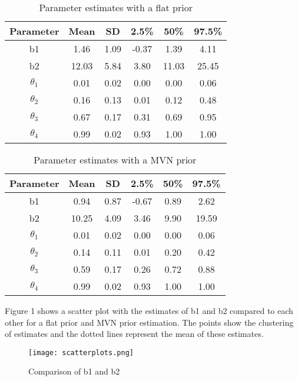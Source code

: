 \documentclass{article}
\begin{document}
\begin{table}[H]
\centering
\caption{Parameter estimates with a flat prior}
\label{my-label}
\begin{tabular}{|c|c|c|c|c|c|}
\hline
Parameter  & Mean  & SD   & 2.5\% & 50\%  & 97.5\% \\ \hline
b1         & 1.46  & 1.09 & -0.37 & 1.39  & 4.11   \\ \hline
b2         & 12.03 & 5.84 & 3.80  & 11.03 & 25.45  \\ \hline
$\theta_1$ & 0.01  & 0.02 & 0.00  & 0.00  & 0.06   \\ \hline
$\theta_2$ & 0.16  & 0.13 & 0.01  & 0.12  & 0.48   \\ \hline
$\theta_3$ & 0.67  & 0.17 & 0.31  & 0.69  & 0.95   \\ \hline
$\theta_4$ & 0.99  & 0.02 & 0.93  & 1.00  & 1.00   \\ \hline
\end{tabular}
\end{table}

\begin{table}[H]
\centering
\caption{Parameter estimates with a MVN prior}
\label{my-label}
\begin{tabular}{|c|c|c|c|c|c|}
\hline
Parameter  & Mean  & SD   & 2.5\% & 50\% & 97.5\% \\ \hline
b1         & 0.94  & 0.87 & -0.67 & 0.89 & 2.62   \\ \hline
b2         & 10.25 & 4.09 & 3.46  & 9.90 & 19.59  \\ \hline
$\theta_1$ & 0.01  & 0.02 & 0.00  & 0.00 & 0.06   \\ \hline
$\theta_2$ & 0.14  & 0.11 & 0.01  & 0.20 & 0.42   \\ \hline
$\theta_3$ & 0.59  & 0.17 & 0.26  & 0.72 & 0.88   \\ \hline
$\theta_4$ & 0.99  & 0.02 & 0.93  & 1.00 & 1.00   \\ \hline
\end{tabular}
\end{table}

Figure 1 shows a scatter plot with the estimates of b1 and b2 compared to each other for a flat prior and MVN prior estimation. The points show the clustering of estimates and the dotted lines represent the mean of these estimates.
 \begin{figure}[H]
\centering
\texttt{[image: scatterplots.png]}
\caption{Comparison of b1 and b2}
\label{deltat}
\end{figure}
\end{document}
